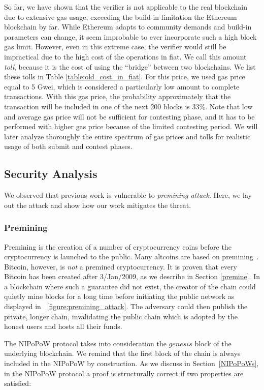So far, we have shown that the verifier is not applicable to the real
blockchain due to extensive gas usage, exceeding the build-in limitation the
Ethereum blockchain by far. While Ethereum adapts to community demands and
build-in parameters can change, it seem improbable to ever incorporate such a
high block gas limit. However, even in this extreme case, the verifier would
still be impractical due to the high cost of the operations in fiat. We call
this amount \emph{toll}, because it is the cost of using the ``bridge'' between
two blockchains. We list these tolls in Table \ref{table:old_cost_in_fiat}. For
this price, we used gas price equal to 5 Gwei, which is considered a
particularly low amount to complete transactions. With this gas price, the
probability approximately that the transaction will be included in one of the
next 200 blocks is 33\%. Note that low and average gas price will not be
sufficient for contesting phase, and it has to be performed with higher gas
price because of the limited contesting period. We will later analyze
thoroughly the entire spectrum of gas prices and tolls for realistic usage of
both submit and contest phases.

\subsection{Security Analysis}

We observed that previous work is vulnerable to \emph{premining attack}. Here,
we lay out the attack and show how our work mitigates the threat.
\subsubsection{Premining} Premining is the creation of a number of
cryptocurrency coins before the cryptocurrency is launched to the public. Many
altcoins are based on premining~\cite{premine}. Bitcoin, however, is \emph{not}
a premined cryptocurrency. It is proven that every Bitcoin has been created
after 3/Jan/2009, as we describe in Section \ref{premine}. In a blockchain
where such a guarantee did not exist, the creator of the chain could quietly
mine blocks for a long time before initiating the public network as displayed
in ~\ref{figure:premining_attack}. The adversary could then publish the
private, longer chain, invalidating the public chain which is adopted by the
honest users and hosts all their funds.



The NIPoPoW protocol takes into consideration the $genesis$ block of the
underlying blockchain. We remind that the first block of the chain is always
included in the NIPoPoW by construction. As we discuss in
Section~\ref{NIPoPoWs}, in the NIPoPoW protocol a proof is structurally correct
if two properties are satisfied:

